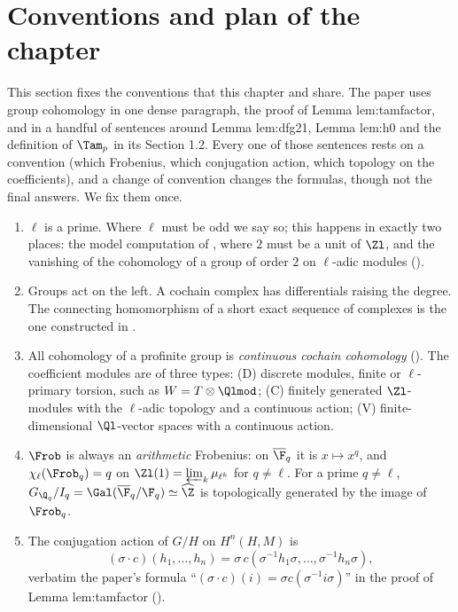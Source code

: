 \section{Conventions and plan of the chapter}\label{sec:cohomology:conventions}

This section fixes the conventions that this chapter and  share. The paper uses group cohomology in one
dense paragraph, the proof of Lemma lem:tamfactor, and in a handful of sentences around Lemma lem:dfg21, Lemma lem:h0 and the
definition of $\Tam_p$ in its Section 1.2. Every one of those sentences rests on a convention (which Frobenius, which conjugation action,
which topology on the coefficients), and a change of convention changes the formulas, though not the final answers. We fix them once.

\begin{convention}\label{conv:cohomology:conventions}
\begin{enumerate}[label=(\alph*)]
\item $\ell$ is a prime. Where $\ell$ must be odd we say so; this happens in exactly two places: the model computation of
, where $2$ must be a unit of $\Zl$, and the vanishing of the cohomology of a group of order $2$ on $\ell$-adic modules
().
\item Groups act on the left. A cochain complex has differentials raising the degree. The connecting homomorphism of a short exact sequence of
complexes is the one constructed in .
\item All cohomology of a profinite group is \emph{continuous cochain cohomology} (). The coefficient modules are of three
types: (D) discrete modules, finite or $\ell$-primary torsion, such as $W=T\otimes\Qlmod$; (C) finitely generated $\Zl$-modules with the $\ell$-adic
topology and a continuous action; (V) finite-dimensional $\Ql$-vector spaces with a continuous action.
\item $\Frob$ is always an \emph{arithmetic} Frobenius: on $\overline\F_q$ it is $x\mapsto x^q$, and $\chi_\ell(\Frob_q)=q$ on $\Zl(1)=\varprojlim_k\mu_{\ell^k}$ for $q\ne\ell$.
For a prime $q\ne\ell$, $G_{\Q_q}/I_q=\Gal(\overline\F_q/\F_q)\simeq\widehat\Z$ is topologically generated by the image of $\Frob_q$.
\item The conjugation action of $G/H$ on $H^n(H,M)$ is
\[
(\sigma\cdot c)(h_1,\dots,h_n)=\sigma\,c(\sigma^{-1}h_1\sigma,\dots,\sigma^{-1}h_n\sigma),
\]
verbatim the paper's formula ``$(\sigma\cdot c)(i)=\sigma c(\sigma^{-1}i\sigma)$'' in the proof of Lemma lem:tamfactor ().

\end{enumerate}
\end{convention}
